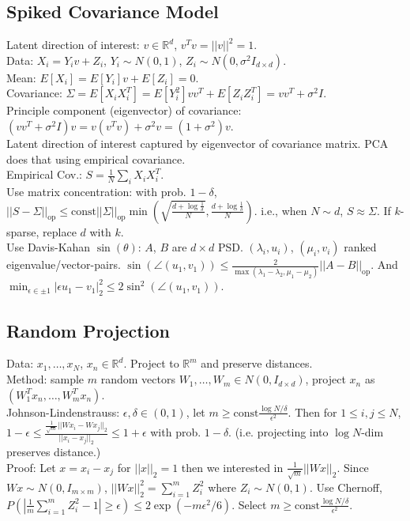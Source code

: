 \subsection*{Spiked Covariance Model}

Latent direction of interest: $v \in \mathbb{R}^d$, $v^Tv = ||v||^2 = 1$.\\
Data: $X_i = Y_i v + Z_i$, $Y_i \sim N(0, 1)$, $Z_i \sim N(0, \sigma^2I_{d\times d})$.\\
Mean: $E[X_i] = E[Y_i]v + E[Z_i] = 0$.\\
Covariance: $\Sigma = E[X_iX_i^T] = E[Y_i^2]vv^T + E[Z_iZ_i^T] = vv^T + \sigma^2I$.\\
Principle component (eigenvector) of covariance: $(vv^T + \sigma^2 I)v=v(v^Tv)+\sigma^2 v = (1+\sigma^2)v$.\\
Latent direction of interest captured by eigenvector of covariance matrix. PCA does that using empirical covariance.\\
Empirical Cov.: $S = \frac{1}{N}\sum_i X_i X_i^T$.\\
Use matrix concentration: with prob. $1-\delta$, $||S-\Sigma||_{\text{op}} \leq \text{const} ||\Sigma||_{\text{op}} \min(\sqrt{\frac{d+\log\frac{1}{\delta}}{N}}, \frac{d+\log\frac{1}{\delta}}{N})$. i.e., when $N \sim d$, $S \approx \Sigma$. If $k$-sparse, replace $d$ with $k$.\\
Use Davis-Kahan $\sin(\theta)$: $A$, $B$ are $d\times d$ PSD. $(\lambda_i, u_i)$, $(\mu_i, v_i)$ ranked eigenvalue/vector-pairs. $\sin(\angle(u_1, v_1))\leq \frac{2}{\max(\lambda_1 - \lambda_2, \mu_1 - \mu_2)} ||A-B||_{\text{op}}$. And $\min_{\epsilon\in{\pm1}}|\epsilon u_1 - v_1|_2^2 \leq 2 \sin^2(\angle(u_1, v_1))$.

\subsection*{Random Projection}

Data: $x_1, \dots, x_N$, $x_n \in \mathbb{R}^d$. Project to $\mathbb{R}^m$ and preserve distances.\\
Method: sample $m$ random vectors $W_1, \dots, W_m \in N(0, I_{d\times d})$, project $x_n$ as $(W_1^Tx_n, \dots, W_m^Tx_n)$.\\
Johnson-Lindenstrauss: $\epsilon, \delta \in (0, 1)$, let $m \geq \text{const}\frac{\log N/\delta}{\epsilon^2}$. Then for $1 \leq i, j \leq N$, $1-\epsilon \leq \frac{\frac{1}{\sqrt{m}}||W x_i - W x_j||_2}{||x_i - x_j||_2} \leq 1+\epsilon$ with prob. $1-\delta$. (i.e. projecting into $\log N$-dim preserves distance.)\\
Proof: Let $x = x_i - x_j$ for $||x||_2=1$ then we interested in $\frac{1}{\sqrt{m}}||Wx||_2$. Since $Wx \sim N(0, I_{m\times m})$, $||Wx||_2^2 = \sum_{i=1}^m Z_i^2$ where $Z_i \sim N(0, 1)$. Use Chernoff, $P(|\frac{1}{m}\sum_{i=1}^m Z_i^2-1| \geq \epsilon) \leq 2 \exp(-m\epsilon^2/6)$. Select $m \geq \text{const}\frac{\log N / \delta}{\epsilon^2}$.

